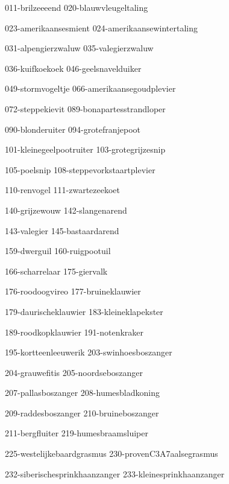 \begin{figure*}[h!]
    \centering
    \subfig
    {011-brilzeeeend}
    {020-blauwvleugeltaling}

    \subfig
    {023-amerikaansesmient}
    {024-amerikaansewintertaling}

    \subfig
    {031-alpengierzwaluw}
    {035-valegierzwaluw}

    \subfig
    {036-kuifkoekoek}
    {046-geelsnavelduiker}

    \subfig
    {049-stormvogeltje}
    {066-amerikaansegoudplevier}

    \subfig
    {072-steppekievit}
    {089-bonapartesstrandloper}
\end{figure*}


\begin{figure*}[h!]
    \centering
    \subfig
    {090-blonderuiter}
    {094-grotefranjepoot}

    \subfig
    {101-kleinegeelpootruiter}
    {103-grotegrijzesnip}

    \subfig
    {105-poelsnip}
    {108-steppevorkstaartplevier}

    \subfig
    {110-renvogel}
    {111-zwartezeekoet}

    \subfig
    {140-grijzewouw}
    {142-slangenarend}

    \subfig
    {143-valegier}
    {145-bastaardarend}

\end{figure*}

\begin{figure*}[h!]
    \centering
    \subfig
    {159-dwerguil}
    {160-ruigpootuil}

    \subfig
    {166-scharrelaar}
    {175-giervalk}

    \subfig
    {176-roodoogvireo}
    {177-bruineklauwier}

    \subfig
    {179-daurischeklauwier}
    {183-kleineklapekster}

    \subfig
    {189-roodkopklauwier}
    {191-notenkraker}

    \subfig
    {195-kortteenleeuwerik}
    {203-swinhoesboszanger}

\end{figure*}

\begin{figure*}[h!]
    \centering
    \subfig
    {204-grauwefitis}
    {205-noordseboszanger}

    \subfig
    {207-pallasboszanger}
    {208-humesbladkoning}
    
    \subfig
    {209-raddesboszanger}
    {210-bruineboszanger}

    \subfig
    {211-bergfluiter}
    {219-humesbraamsluiper}

    \subfig
    {225-westelijkebaardgrasmus}
    {230-provenC3A7aalsegrasmus}

    \subfig
    {232-siberischesprinkhaanzanger}
    {233-kleinesprinkhaanzanger}


\end{figure*}

